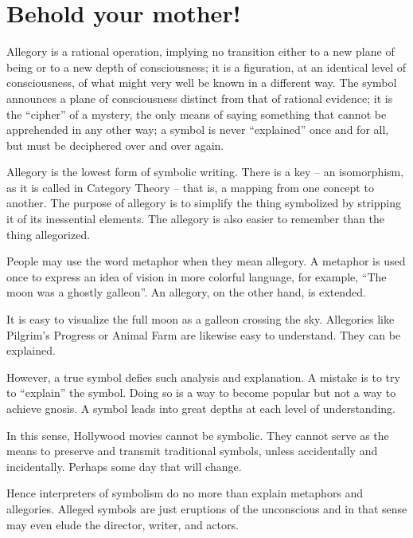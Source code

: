 \section{Behold your mother!}

\begin{quotex}
Allegory is a rational operation, implying no transition either to a new plane of being or to a new depth of consciousness; it is a figuration, at an identical level of consciousness, of what might very well be known in a different way. The symbol announces a plane of consciousness distinct from that of rational evidence; it is the ``cipher'' of a mystery, the only means of saying something that cannot be apprehended in any other way; a symbol is never ``explained'' once and for all, but must be deciphered over and over again.
\end{quotex}


Allegory is the lowest form of symbolic writing. There is a key -- an isomorphism, as it is called in Category Theory -- that is, a mapping from one concept to another. The purpose of allegory is to simplify the thing symbolized by stripping it of its inessential elements. The allegory is also easier to remember than the thing allegorized.

People may use the word metaphor when they mean allegory. A metaphor is used once to express an idea of vision in more colorful language, for example, ``The moon was a ghostly galleon''. An allegory, on the other hand, is extended.

It is easy to visualize the full moon as a galleon crossing the sky. Allegories like Pilgrim's Progress or Animal Farm are likewise easy to understand. They can be explained.

However, a true symbol defies such analysis and explanation. A mistake is to try to ``explain'' the symbol. Doing so is a way to become popular but not a way to achieve gnosis. A symbol leads into great depths at each level of understanding.

In this sense, Hollywood movies cannot be symbolic. They cannot serve as the means to preserve and transmit traditional symbols, unless accidentally and incidentally. Perhaps some day that will change.

Hence interpreters of symbolism do no more than explain metaphors and allegories. Alleged symbols are just eruptions of the unconscious and in that sense may even elude the director, writer, and actors.

